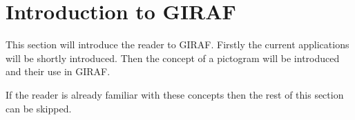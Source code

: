 \section{Introduction to GIRAF}\label{sec:giraf-intro}
This section will introduce the reader to GIRAF.
Firstly the current applications will be shortly introduced.
Then the concept of a pictogram will be introduced and their use in GIRAF.

If the reader is already familiar with these concepts then the rest of this section can be skipped.



